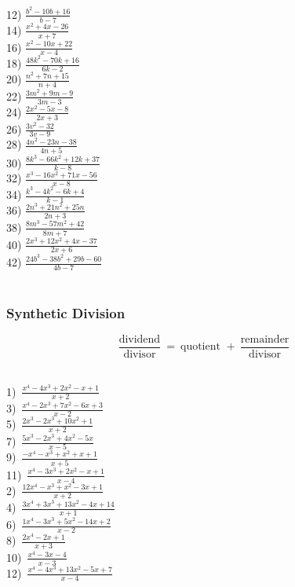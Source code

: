 \begin{multicols}{2}
  12) $\frac{b^2 - 10 b + 16}{b - 7}$\\
  14) $\frac{x^2 + 4 x - 26}{x + 7}$\\
  16) $\frac{x^2 - 10 x + 22}{x - 4}$\\
  18) $\frac{48 k^2 - 70 k + 16}{6 k - 2}$\\
  20) $\frac{n^2 + 7 n + 15}{n + 4}$\\
  22) $\frac{3 m^2 + 9 m - 9}{3 m - 3}$\\
  24) $\frac{2 x^2 - 5 x - 8}{2 x + 3}$\\
  26) $\frac{3 v^2 - 32}{3 v - 9}$\\
  28) $\frac{4 n^2 - 23 n - 38}{4 n + 5}$\\
  30) $\frac{8 k^3 - 66 k^2 + 12 k + 37}{k - 8}$\\
  32) $\frac{x^3 - 16 x^2 + 71 x - 56}{x - 8}$\\
  34) $\frac{k^3 - 4 k^2 - 6 k + 4}{k - 1}$\\
  36) $\frac{2 n^3 + 21 n^2 + 25 n}{2 n + 3}$\\
  38) $\frac{8 m^3 - 57 m^2 + 42}{8 m + 7}$\\
  40) $\frac{2 x^3 + 12 x^2 + 4 x - 37}{2 x + 6}$\\
  42) $\frac{24 b^3 - 38 b^2 + 29 b - 60}{4 b - 7}$\\
~\\
\end{multicols}

\newpage

\subsubsection{Synthetic Division}

{}
$$\frac{\text{dividend}}{\text{divisor}}~=~\text{quotient~}+~\frac{\text{remainder}}{\text{divisor}}$$
\\
\begin{multicols}{2}
  1)~$\frac{x^4-4x^3+2x^2-x+1 }{x+2}$\\
  3)~$\frac{x^4-2x^3+7x^2-6x+3 }{x-2}$\\
  5)~$\frac{2x^3-2x^3+10x^2+1 }{x+2}$\\
  7)~$\frac{5x^3-2x^3+4x^2-5x }{x-5}$\\
  9)~$\frac{-x^4-x^3+x^2+x+1 }{x+5}$\\
  11)~$\frac{x^4-3x^3+2x^2-x+1 }{x-4}$\\
  2)~$\frac{12x^4-x^3+x^2-3x+1 }{x+2}$\\
  4)~$\frac{3x^4+3x^3+13x^2-4x+14 }{x+1}$\\
  6)~$\frac{1x^4-3x^3+5x^2-14x+2 }{x-2}$\\
  8)~$\frac{2x^4-2x+1 }{x+3}$\\
  10)~$\frac{x^4-3x-4 }{x-3}$\\
  12)~$\frac{x^4-4x^3+13x^2-5x+7 }{x-4}$
\end{multicols}

